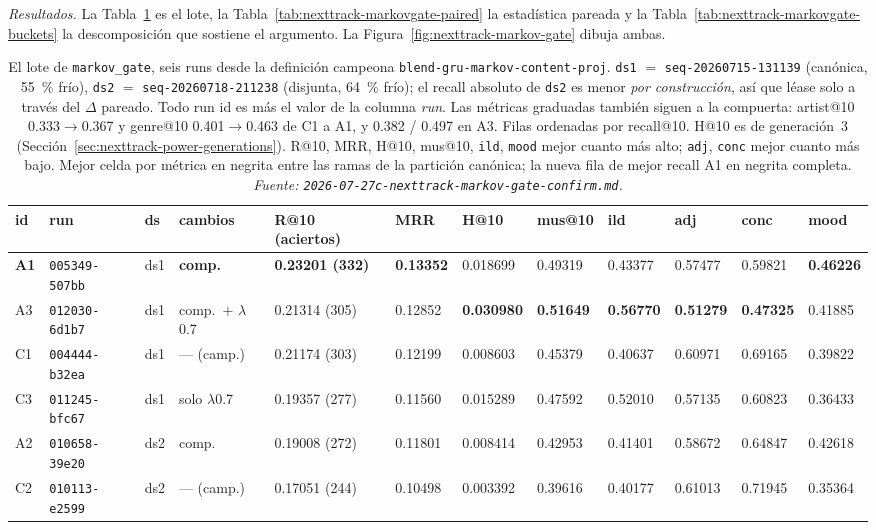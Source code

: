 \documentclass[11pt]{article}
\newcommand{\runid}[1]{\texttt{\small\seqsplit{#1}}}
\newcommand{\dsid}[1]{\texttt{\small #1}}
\newcommand{\best}[1]{\textbf{#1}}
\begin{document}
\emph{Resultados.} La Tabla~\ref{tab:nexttrack-markovgate} es el lote, la
Tabla~\ref{tab:nexttrack-markovgate-paired} la estadística pareada y la
Tabla~\ref{tab:nexttrack-markovgate-buckets} la descomposición que sostiene el argumento.
La Figura~\ref{fig:nexttrack-markov-gate} dibuja ambas.

\begin{table}[ht]
  \centering
  \caption{El lote de \texttt{markov\_gate}, seis runs desde la definición campeona
  \texttt{blend-gru-markov-content-proj}. \dsid{ds1} $=$
  \dsid{seq-20260715-131139} (canónica, \SI{55}{\percent} frío), \dsid{ds2} $=$
  \dsid{seq-20260718-211238} (disjunta, \SI{64}{\percent} frío); el recall
  absoluto de \dsid{ds2} es menor \emph{por construcción}, así que léase solo a
  través del $\Delta$ pareado. Todo run id es \protect\runid{run-20260728-} más el
  valor de la columna \emph{run}. Las métricas graduadas también siguen a la
  compuerta: artist@10 \num{0.333}$\to$\num{0.367} y genre@10
  \num{0.401}$\to$\num{0.463} de C1 a A1, y \num{0.382} / \num{0.497} en A3. Filas
  ordenadas por recall@10. H@10 es de generación~3
  (Sección~\ref{sec:nexttrack-power-generations}). R@10, MRR, H@10, mus@10, \texttt{ild},
  \texttt{mood} mejor cuanto más alto; \texttt{adj}, \texttt{conc} mejor cuanto más
  bajo. Mejor celda por métrica en negrita entre las ramas de la partición
  canónica; la nueva fila de mejor recall A1 en negrita completa.
  \emph{Fuente: \texttt{2026-07-27c-nexttrack-markov-gate-confirm.md}.}}
  \label{tab:nexttrack-markovgate}
  {\scriptsize\setlength{\tabcolsep}{1.6pt}\begin{tabular}{llllllllllll}
    \toprule
    id & run & ds & cambios & R@10 (aciertos) & MRR & H@10 & mus@10 & ild & adj & conc & mood \\
    \midrule
    \best{A1} & \texttt{005349-507bb} & ds1 & \best{comp.} & \best{0.23201 (332)} & \best{0.13352} & 0.018699 & 0.49319 & 0.43377 & 0.57477 & 0.59821 & \best{0.46226} \\
    A3 & \texttt{012030-6d1b7} & ds1 & comp.\ $+$ $\lambda$0.7 & 0.21314 (305) & 0.12852 & \best{0.030980} & \best{0.51649} & \best{0.56770} & \best{0.51279} & \best{0.47325} & 0.41885 \\
    C1 & \texttt{004444-b32ea} & ds1 & --- (camp.) & 0.21174 (303) & 0.12199 & 0.008603 & 0.45379 & 0.40637 & 0.60971 & 0.69165 & 0.39822 \\
    C3 & \texttt{011245-bfc67} & ds1 & solo $\lambda$0.7 & 0.19357 (277) & 0.11560 & 0.015289 & 0.47592 & 0.52010 & 0.57135 & 0.60823 & 0.36433 \\
    A2 & \texttt{010658-39e20} & ds2 & comp. & 0.19008 (272) & 0.11801 & 0.008414 & 0.42953 & 0.41401 & 0.58672 & 0.64847 & 0.42618 \\
    C2 & \texttt{010113-e2599} & ds2 & --- (camp.) & 0.17051 (244) & 0.10498 & 0.003392 & 0.39616 & 0.40177 & 0.61013 & 0.71945 & 0.35364 \\
    \bottomrule
  \end{tabular}}
\end{table}
\end{document}
